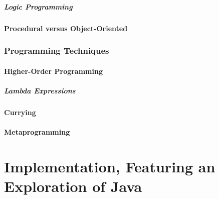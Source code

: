 \subsubsection{Logic Programming}


\subsection{Procedural versus Object-Oriented}


\toclineskip
\section{Programming Techniques}

\subsection{Higher-Order Programming}

\subsubsection{Lambda Expressions}

\subsection{Currying}

\subsection{Metaprogramming}

\newpage



\part*{Implementation, Featuring an Exploration of Java}

